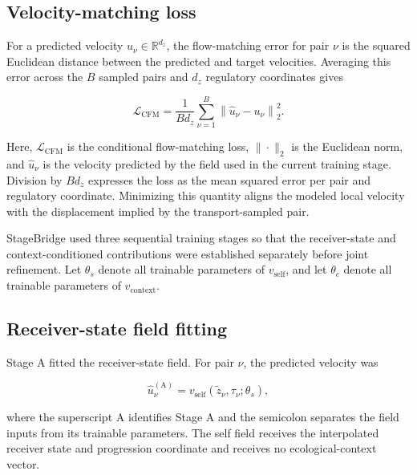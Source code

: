 \subsection{Velocity-matching loss}
\label{appb-sec:methods-cfm-loss}

For a predicted velocity \(\widehat{u}_\nu\in\mathbb{R}^{d_z}\), the
flow-matching error for pair \(\nu\) is the squared Euclidean distance between
the predicted and target velocities. Averaging this error across the \(B\)
sampled pairs and \(d_z\) regulatory coordinates gives

\begin{equation}
\mathcal{L}_{\mathrm{CFM}}
=
\frac{1}{B d_z}
\sum_{\nu=1}^{B}
\left\|
\widehat{u}_\nu-u_\nu
\right\|_2^2.
\label{appb-eq:methods-general-cfm-loss}
\end{equation}

Here, \(\mathcal{L}_{\mathrm{CFM}}\) is the conditional flow-matching loss,
\(\|\cdot\|_2\) is the Euclidean norm, and
\(\widehat{u}_\nu\) is the velocity predicted by the field used in the current
training stage. Division by \(B d_z\) expresses the loss as the mean squared
error per pair and regulatory coordinate. Minimizing this quantity aligns the
modeled local velocity with the displacement implied by the
transport-sampled pair.

StageBridge used three sequential training stages so that the receiver-state
and context-conditioned contributions were established separately before
joint refinement. Let \(\theta_s\) denote all trainable parameters of
\(v_{\mathrm{self}}\), and let \(\theta_c\) denote all trainable parameters of
\(v_{\mathrm{context}}\).

\subsection{Receiver-state field fitting}
\label{appb-sec:methods-training-stage-a}

Stage A fitted the receiver-state field. For pair \(\nu\), the predicted
velocity was

\begin{equation}
\widehat{u}_\nu^{(\mathrm{A})}
=
v_{\mathrm{self}}
\left(
\widetilde{z}_\nu,
\tau_\nu;
\theta_s
\right),
\label{appb-eq:methods-stage-a-prediction}
\end{equation}

where the superscript \(\mathrm{A}\) identifies Stage A and the semicolon
separates the field inputs from its trainable parameters. The self field
receives the interpolated receiver state and progression coordinate and
receives no ecological-context vector.

